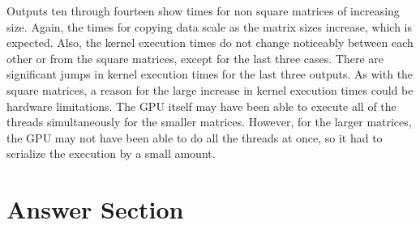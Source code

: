 \documentclass{article}
\begin{document}
Outputs ten through fourteen show times for non square matrices of increasing size. Again, the times for copying data scale as the matrix sizes increase, which is expected. Also, the kernel execution times do not change noticeably between each other or from the square matrices, except for the last three cases. There are significant jumps in kernel execution times for the last three outputs. As with the square matrices, a reason for the large increase in kernel execution times could be hardware limitations. The GPU itself may have been able to execute all of the threads simultaneously for the smaller matrices. However, for the larger matrices, the GPU may not have been able to do all the threads at once, so it had to serialize the execution by a small amount.\\ 

\section{Answer Section}
\end{document}
